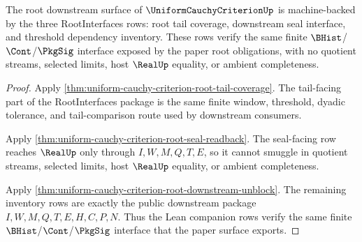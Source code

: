 \begin{theorem}
\label{thm:uniform-cauchy-criterion-root-interfaces-lean-companion}
The root downstream surface of $\UniformCauchyCriterionUp$ is machine-backed by the three RootInterfaces rows: root tail coverage, downstream seal interface, and threshold dependency inventory. These rows verify the same finite $\BHist$/$\Cont$/$\PkgSig$ interface exposed by the paper root obligations, with no quotient streams, selected limits, host $\RealUp$ equality, or ambient completeness.
\end{theorem}
\begin{proof}
Apply \autoref{thm:uniform-cauchy-criterion-root-tail-coverage}. The tail-facing part of the RootInterfaces package is the same finite window, threshold, dyadic tolerance, and tail-comparison route used by downstream consumers.

Apply \autoref{thm:uniform-cauchy-criterion-root-seal-readback}. The seal-facing row reaches $\RealUp$ only through $I,W,M,Q,T,E$, so it cannot smuggle in quotient streams, selected limits, host $\RealUp$ equality, or ambient completeness.

Apply \autoref{thm:uniform-cauchy-criterion-root-downstream-unblock}. The remaining inventory rows are exactly the public downstream package $I,W,M,Q,T,E,H,C,P,N$. Thus the Lean companion rows verify the same finite $\BHist$/$\Cont$/$\PkgSig$ interface that the paper surface exports.
\end{proof}
